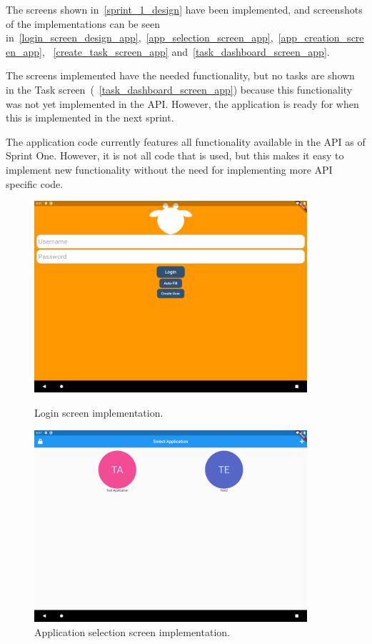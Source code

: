 The screens shown in~\autoref{sprint_1_design} have been implemented, and screenshots of the implementations can be seen in~\autoref{login_screen_design_app},~\autoref{app_selection_screen_app},~\autoref{app_creation_screen_app}, ~\autoref{create_task_screen_app} and~\autoref{task_dashboard_screen_app}.

The screens implemented have the needed functionality, but no tasks are shown in the Task screen~(~\autoref{task_dashboard_screen_app}) because this functionality was not yet implemented in the API.
However, the application is ready for when this is implemented in the next sprint.

The application code currently features all functionality available in the API as of Sprint One.
However, it is not all code that is used, but this makes it easy to implement new functionality without the need for implementing more API specific code. 

\begin{figure}[H]
    \centering
    \begin{minipage}{0.45\textwidth}
        \centering
        \includegraphics[width=0.9\textwidth]{Sprint_1/images/login_screen_app.png}
        \caption{Login screen implementation.}
        \label{login_screen_design_app}
    \end{minipage}\hfill
    \begin{minipage}{0.45\textwidth}
        \includegraphics[width=0.9\textwidth]{Sprint_1/images/app_selection_screen_app.png}
        \caption{Application selection screen implementation.}
        \label{app_selection_screen_app}
    \end{minipage}
\end{figure}

